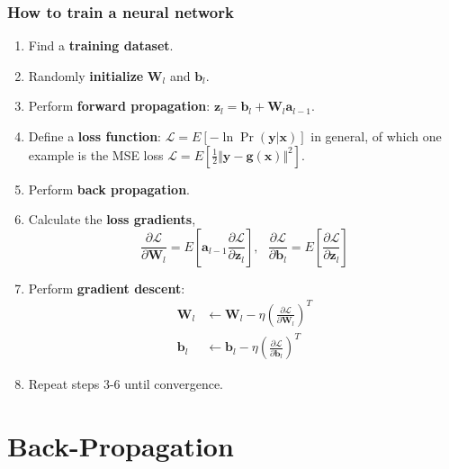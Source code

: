 \documentclass{beamer}
\begin{document}
\begin{frame}
  \frametitle{How to train a neural network}
  \begin{enumerate}
  \item Find a {\bf training dataset}.
    \item Randomly {\bf initialize} $\mathbf{W}_{l}$ and
      $\mathbf{b}_{l}$.
    \item Perform {\bf forward propagation}:
      $\mathbf{z}_l=\mathbf{b}_l+\mathbf{W}_l\mathbf{a}_{l-1}$.
    \item Define a {\bf loss function}:
      $\mathcal{L}=E\left[-\ln\Pr(\mathbf{y}|\mathbf{x})\right]$ in
      general, of which one example is the MSE loss
      $\mathcal{L}=E\left[\frac{1}{2}\Vert\mathbf{y}-\mathbf{g}(\mathbf{x})\Vert^2\right]$.
    \item Perform {\bf back propagation}.
    \item Calculate the {\bf loss gradients},
      \begin{displaymath}
        \frac{\partial\mathcal{L}}{\partial\mathbf{W}_{l}}=
        E\left[\mathbf{a}_{l-1}\frac{\partial\mathcal{L}}{\partial\mathbf{z}_l}\right],~~~
        \frac{\partial\mathcal{L}}{\partial\mathbf{b}_{l}}=
        E\left[\frac{\partial\mathcal{L}}{\partial\mathbf{z}_l}\right]
      \end{displaymath}
    \item Perform {\bf gradient descent}:
      \begin{align*}
        \mathbf{W}_l
        &\leftarrow\mathbf{W}_l-\eta\left(\frac{\partial{\mathcal L}}{\partial\mathbf{W}_l}\right)^T\\
        \mathbf{b}_l
        &\leftarrow\mathbf{b}_l-\eta\left(\frac{\partial{\mathcal L}}{\partial\mathbf{b}_l}\right)^T
      \end{align*}
    \item Repeat steps 3-6 until convergence.
  \end{enumerate}
\end{frame}

\section[Backprop]{Back-Propagation}
\setcounter{subsection}{1}
\end{document}
